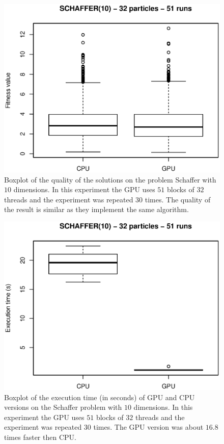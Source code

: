 \documentclass{article}
\begin{document}
    \begin{figure}[!htb]
        \centering
        \includegraphics[width=.7\textwidth]{../img/schaffer10_32particles_fitness.eps}
        \caption{Boxplot of the quality of the solutions on the problem Schaffer with $10$ dimensions. In this experiment the GPU uses $51$ blocks of $32$ threads and the experiment was repeated $30$ times. The quality of the result is similar as they implement the same algorithm.}
        \label{fig:schaffer10_32particles_fitness}
    \end{figure}

    
    \begin{figure}[!htb]
        \centering
        \includegraphics[width=.7\textwidth]{../img/schaffer10_32particles_time.eps}
        \caption{Boxplot of the execution time (in seconds) of GPU and CPU versions on the Schaffer problem with $10$ dimensions. In this experiment the GPU uses $51$ blocks of $32$ threads and the experiment was repeated $30$ times. The GPU version was about $16.8$ times faster then CPU.}
        \label{fig:schaffer10_32particles_time}
    \end{figure}
\end{document}
